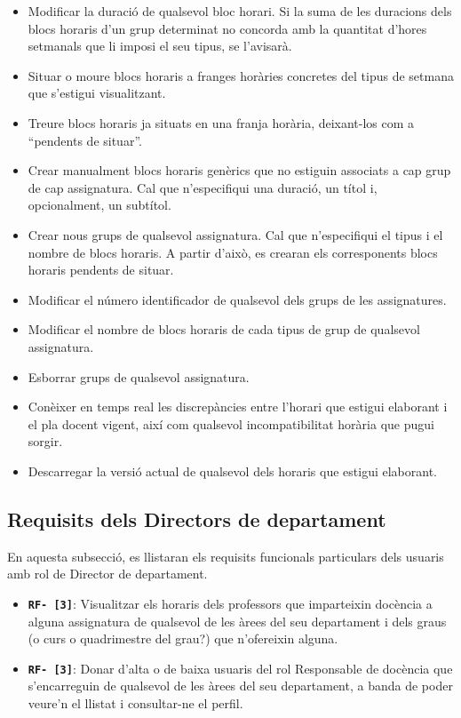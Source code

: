 \documentclass[a4paper,12pt]{ThesisStyle}
\begin{document}
\begin{itemize}
\begin{itemize}
      \item Modificar la duració de qualsevol bloc horari. Si la suma de les duracions dels blocs horaris d'un grup determinat no concorda amb la quantitat d'hores setmanals que li imposi el seu tipus, se l'avisarà.
      
      \item Situar o moure blocs horaris a franges horàries concretes del tipus de setmana que s'estigui visualitzant.
      \item Treure blocs horaris ja situats en una franja horària, deixant-los com a ``pendents de situar''.
      \item Crear manualment blocs horaris genèrics que no estiguin associats a cap grup de cap assignatura. Cal que n'especifiqui una duració, un títol i, opcionalment, un subtítol.
      
      \item Crear nous grups de qualsevol assignatura. Cal que n'especifiqui el tipus i el nombre de blocs horaris. A partir d'això, es crearan els corresponents blocs horaris pendents de situar.
      \item Modificar el número identificador de qualsevol dels grups de les assignatures.
      \item Modificar el nombre de blocs horaris de cada tipus de grup de qualsevol assignatura.
      \item Esborrar grups de qualsevol assignatura.
      \item Conèixer en temps real les discrepàncies entre l'horari que estigui elaborant i el pla docent vigent, així com qualsevol incompatibilitat horària que pugui sorgir.
      
      \item Descarregar la versió actual de qualsevol dels horaris que estigui elaborant.
    \end{itemize}
\end{itemize}

\subsection{Requisits dels Directors de departament} %
\label{subsec:requisits_director_departament}

En aquesta subsecció, es llistaran els requisits funcionals particulars dels usuaris amb rol de Director de departament.

\begin{itemize}
  \item \texttt{\textbf{RF- [3]}}: Visualitzar els horaris dels professors que imparteixin docència a alguna assignatura de qualsevol de les àrees del seu departament i dels graus (o curs o quadrimestre del grau?) que n'ofereixin alguna.
  \item \texttt{\textbf{RF- [3]}}: Donar d'alta o de baixa usuaris del rol Responsable de docència que s'encarreguin de qualsevol de les àrees del seu departament, a banda de poder veure'n el llistat i consultar-ne el perfil.
\end{itemize}
\end{document}
